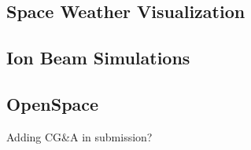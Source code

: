 \subsection{Space Weather Visualization}
\label{contributions:physics:spaceweather}
\cite{Bock14CME}

\subsection{Ion Beam Simulations}
\label{contributions:physics:ion}

\subsection{OpenSpace}
\label{contributions:physics:openspace}
\cite{Bock15bOpenSpace}
\cite{Bock15OpenSpace}

Adding CG\&A in submission?